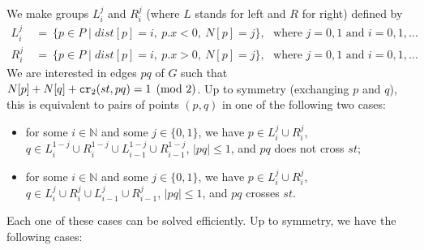 \documentclass[a4paper,USenglish]{lipics}
\newcommand{\NN}{\ensuremath{\mathbb N}}  %
\def\dist{\mathit{dist}}
\newcommand\CR{\mbox{\tt cr}_2}		  %
\let\le\leqslant
\begin{document}
We make groups $L_i^j$ and $R_i^j$ (where $L$ stands for left and $R$ for right) 
defined by
\begin{align*}
	L_i^j ~&=~ \{ p\in P \mid \dist[p]=i,~ p.x<0,~ N[p]=j \} ,
	~~~\text{where $j=0,1$ and $i=0,1,\dots$}\\
	R_i^j ~&=~ \{ p\in P \mid \dist[p]=i,~ p.x>0,~ N[p]=j \} ,
	~~~\text{where $j=0,1$ and $i=0,1,\dots$}
\end{align*}
We are interested in edges $pq$ of $G$ such that $N[p]+N[q]+\CR(st,pq)=1 \pmod 2$. 
Up to symmetry (exchanging $p$ and $q$), this is equivalent to pairs of points
$(p,q)$ in one of the following two cases:
\begin{itemize}
	\item for some $i\in \NN$ and some $j\in \{0,1\}$, we have
			$p\in L_i^j\cup R_i^j$, 
			$q\in L_i^{1-j}\cup R_i^{1-j}\cup L_{i-1}^{1-j}\cup R_{i-1}^{1-j}$, 
			$|pq|\le 1$, and $pq$ does not cross $st$;
	\item for some $i\in \NN$ and some $j\in \{0,1\}$, we have
			$p\in L_i^j\cup R_i^j$, 
			$q\in L_i^{j}\cup R_i^{j}\cup L_{i-1}^{j}\cup R_{i-1}^{j}$, 
			$|pq|\le 1$, and $pq$ crosses $st$.
\end{itemize}
Each one of these cases can be solved efficiently.
Up to symmetry, we have the following cases:
\end{document}
